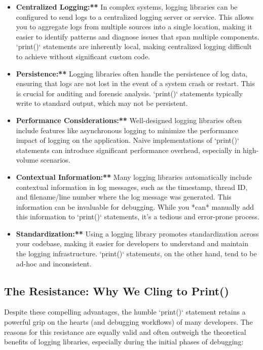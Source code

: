 \documentclass{article}
\begin{document}
{{{{\begin{itemize}
    \item \textbf{Centralized Logging:**} In complex systems, logging libraries can be configured to send logs to a centralized logging server or service. This allows you to aggregate logs from multiple sources into a single location, making it easier to identify patterns and diagnose issues that span multiple components.  `print()` statements are inherently local, making centralized logging difficult to achieve without significant custom code.

    \item \textbf{Persistence:**} Logging libraries often handle the persistence of log data, ensuring that logs are not lost in the event of a system crash or restart. This is crucial for auditing and forensic analysis.  `print()` statements typically write to standard output, which may not be persistent.

    \item \textbf{Performance Considerations:**} Well-designed logging libraries often include features like asynchronous logging to minimize the performance impact of logging on the application.  Naive implementations of `print()` statements can introduce significant performance overhead, especially in high-volume scenarios.

    \item \textbf{Contextual Information:**} Many logging libraries automatically include contextual information in log messages, such as the timestamp, thread ID, and filename/line number where the log message was generated. This information can be invaluable for debugging. While you *can* manually add this information to `print()` statements, it's a tedious and error-prone process.

    \item \textbf{Standardization:**} Using a logging library promotes standardization across your codebase, making it easier for developers to understand and maintain the logging infrastructure.  `print()` statements, on the other hand, tend to be ad-hoc and inconsistent.
\end{itemize}

\subsection*{The Resistance: Why We Cling to Print()}

Despite these compelling advantages, the humble `print()` statement retains a powerful grip on the hearts (and debugging workflows) of many developers. The reasons for this resistance are equally valid and often outweigh the theoretical benefits of logging libraries, especially during the initial phases of debugging:

}}}}
\end{document}
